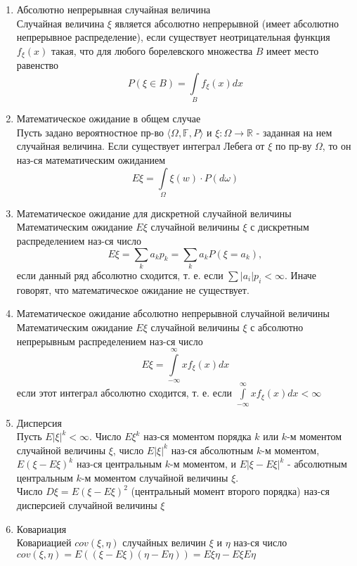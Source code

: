 \documentclass[a4paper, 12pt]{article}
\begin{document}
\begin{enumerate}
    \item Абсолютно непрерывная случайная величина\\
    Случайная величина $\xi$ является абсолютно непрерывной (имеет абсолютно непрерывное распределение), если существует неотрицательная функция $f_{\xi}(x)$ такая, что для любого борелевского множества $B$ имеет место равенство
    \[ P(\xi\in B)=\int\limits_B f_{\xi}(x)dx\]
    
    \item Математическое ожидание в общем случае\\
    Пусть задано вероятностное пр-во $\langle \Omega, \mathbb{F}, P\rangle$ и $\xi:\Omega\rightarrow\mathbb{R}$ - заданная на нем случайная величина. Если существует интеграл Лебега от $\xi$ по пр-ву $\Omega$, то он наз-ся математическим ожиданием
    \[ E\xi=\int\limits_\Omega \xi(w)\cdot P(d\omega)\]
    
    \item Математическое ожидание для дискретной случайной величины\\
    Математическим ожидание $E\xi$ случайной величины $\xi$ с дискретным распределением наз-ся число
    \[ E\xi=\sum\limits_k a_kp_k=\sum\limits_k a_kP(\xi=a_k),\]
    если данный ряд абсолютно сходится, т. е. если $\sum |a_i|p_i <\infty$. Иначе говорят, что математическое ожидание не существует.
    
    \item Математическое ожидание абсолютно непрерывной случайной величины\\
    Математическим ожидание $E\xi$ случайной величины $\xi$ с абсолютно непрерывным распределением наз-ся число
    \[ E\xi=\int\limits_{-\infty}^{\infty}xf_{\xi}(x)dx\]
    если этот интеграл абсолютно сходится, т. е. если $\int\limits_{-\infty}^{\infty}xf_{\xi}(x)dx<\infty$
    
    \item Дисперсия\\
    Пусть $E|\xi|^k<\infty$. Число $E\xi^k$ наз-ся моментом порядка $k$ или $k$-м моментом случайной величины $\xi$, число $E|\xi|^k$ наз-ся абсолютным $k$-м моментом, $E(\xi-E\xi)^k$ наз-ся центральным $k$-м моментом, и $E|\xi-E\xi|^k$ - абсолютным центральным $k$-м моментом случайной величины $\xi$.\\ Число $D\xi=E(\xi-E\xi)^2$ (центральный момент второго порядка) наз-ся дисперсией случайной величины $\xi$
    
    \item Ковариация\\
    Ковариацией $cov(\xi, \eta)$ случайных величин $\xi$ и $\eta$ наз-ся число $cov(\xi,\eta)=E((\xi-E\xi)(\eta-E\eta))=E\xi\eta-E\xi E\eta$
    

\end{enumerate}
\end{document}
